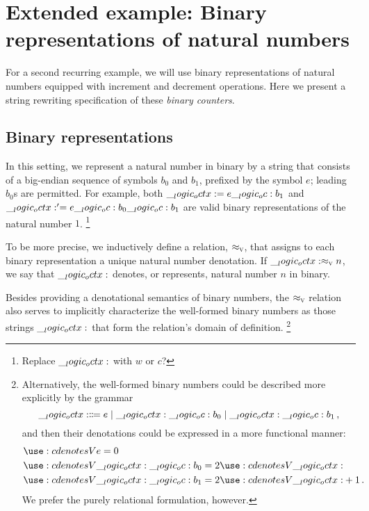 \section{Extended example: Binary representations of natural numbers}\label{sec:string-rewriting:binary-counter}

For a second recurring example, we will use
binary representations of natural numbers equipped with increment and decrement operations. %
Here we present a string rewriting specification of these \emph{binary counters}.

\subsection{Binary representations}

In this setting, we represent a natural number in binary by a string that consists of a big-endian sequence of symbols $b_0$ and $b_1$, prefixed by the symbol $e$; leading $b_0$s are permitted.
For example, both $\__logic_octx: = e \__logic_oc: b_1$ and $\__logic_octx:' = e \__logic_oc: b_0 \__logic_oc: b_1$ are valid binary representations of the natural number $1$.%
\footnote{Replace $\__logic_octx:$ with $w$ or $c$?}

To be more precise, we inductively define a relation, $ \approx\sb{\text{\normalfont\scshape v}} $, that assigns to each binary representation a unique natural number denotation.
If $\__logic_octx: \approx\sb{\text{\normalfont\scshape v}} n$, we say that $\__logic_octx:$ denotes, or represents, natural number $n$ in binary.
Besides providing a denotational semantics of binary numbers, the $ \approx\sb{\text{\normalfont\scshape v}} $ relation also serves to implicitly characterize the well-formed binary numbers as those strings $\__logic_octx:$ that form the relation's domain of definition.%
\footnote{Alternatively, the well-formed binary numbers could be described more explicitly by the grammar
\begin{equation*}
  \__logic_octx: \Coloneqq e \mid \__logic_octx: \__logic_oc: b_0 \mid \__logic_octx: \__logic_oc: b_1
  \,,
\end{equation*}
and then their denotations could be expressed in a more functional manner:
\begin{equation*}
  \begin{lgathered}
    \deno[V]{e} = 0 \\
    \deno[V]{\octx \oc b_0} = 2 \deno[V]{\octx} \\
    \deno[V]{\octx \oc b_1} = 2 \deno[V]{\octx} + 1
    \,.
  \end{lgathered}
\end{equation*}
We prefer the purely relational formulation, however.%
}


